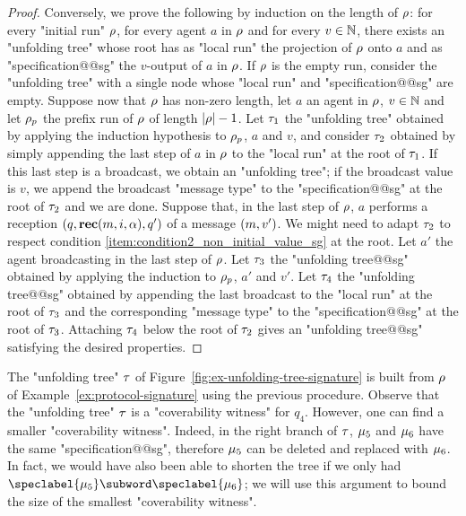 \begin{proof}
Conversely, we prove the following by induction on the length of $\rho$: for every "initial run" $\rho$, for every agent $a$ in $\rho$ and for every $v \in \mathbb{N}$, there exists an "unfolding tree" whose root has as "local run" the projection of $\rho$ onto $a$ and as "specification@@sg" the $v$-output of $a$ in $\rho$. If $\rho$ is the empty run, consider the "unfolding tree" with a single node whose "local run" and "specification@@sg" are empty. Suppose now that $\rho$ has non-zero length, let $a$ an agent in $\rho$, $v \in \mathbb{N}$ and let $\rho_p$ the prefix run of $\rho$ of length $|\rho|-1$.
Let $\tau_1$ the "unfolding tree" obtained by applying the induction hypothesis to $\rho_p$, $a$ and $v$, and consider $\tau_2$ obtained by simply appending the last step of $a$ in $\rho$ to the "local run" at the root of $\tau_1$. If this last step is a broadcast, we obtain an "unfolding tree"; if the broadcast value is $v$, we append the broadcast "message type" to the "specification@@sg" at the root of $\tau_2$ and we are done. 
Suppose that, in the last step of $\rho$, $a$ performs a reception $(q, \textbf{rec}(m, i, \alpha),q')$ of a message $(m,v')$. We might need to adapt $\tau_2$ to respect condition \ref{item:condition2_non_initial_value_sg} at the root. Let $a'$ the agent broadcasting in the last step of $\rho$. Let $\tau_3$ the "unfolding tree@@sg" obtained by applying the induction to $\rho_p$, $a'$ and $v'$. Let $\tau_4$ the "unfolding tree@@sg" obtained by appending the last broadcast to the "local run" at the root of $\tau_3$ and the corresponding "message type" to the "specification@@sg" at the root of $\tau_3$. Attaching $\tau_4$ below the root of $\tau_2$ gives an "unfolding tree@@sg" satisfying the desired properties. 
\end{proof}


	The "unfolding tree" $\tau$ of Figure~\ref{fig:ex-unfolding-tree-signature} is built from $\rho$ of Example~\ref{ex:protocol-signature} using the previous procedure. 
	 Observe that the "unfolding tree" $\tau$  is a "coverability witness" for $q_4$. However, one can find a smaller "coverability witness". 
	Indeed, in the right branch of $\tau$, $\mu_5$ and $\mu_6$ have the same "specification@@sg", therefore $\mu_5$ can be deleted and replaced with $\mu_6$. In fact, we would have also been able to shorten the tree if we only had $\speclabel{\node_5} \subword \speclabel{\node_6}$; we will use this argument to bound the size of the smallest "coverability witness".   

